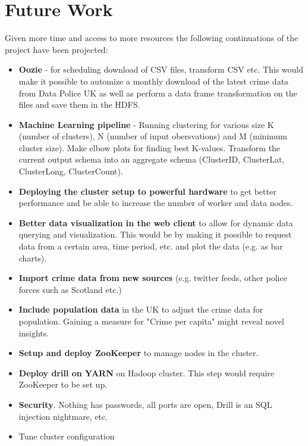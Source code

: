 \documentclass[main.tex]{subfiles}
\begin{document}
\section{Future Work}
Given more time and access to more resources the following continuations of the project have been projected: 

\begin{itemize}
    \item \textbf{Oozie} - for scheduling download of CSV files, transform CSV etc. This would make it possible to automize a monthly download of the latest crime data from Data Police UK as well as perform a data frame transformation on the files and save them in the HDFS.
    \item \textbf{Machine Learning pipeline} - Running clustering for various size K (number of clusters), N (number of input obersvations) and M (minimum cluster size). Make elbow plots for finding best K-values. Transform the current output schema into an aggregate schema (ClusterID, ClusterLat, ClusterLong, ClusterCount).
    \item \textbf{Deploying the cluster setup to powerful hardware} to get better performance and be able to increase the number of worker and data nodes.
    \item \textbf{Better data visualization in the web client} to allow for dynamic data querying and visualization. This would be by making it possible to request data from a certain area, time period, etc. and plot the data (e.g. as bar charts).
    \item \textbf{Import crime data from new sources} (e.g. twitter feeds, other police forces such as Scotland etc.)
    \item \textbf{Include population data} in the UK to adjust the crime data for population. Gaining a measure for "Crime per capita" might reveal novel insights.
    \item \textbf{Setup and deploy ZooKeeper} to manage nodes in the cluster.
    \item \textbf{Deploy drill on YARN} on Hadoop cluster. This step would require ZooKeeper to be set up.
     \item \textbf{Security}. Nothing has passwords, all ports are open, Drill is an SQL injection nightmare, etc.
    \item Tune cluster configuration
\end{itemize}
\end{document}
